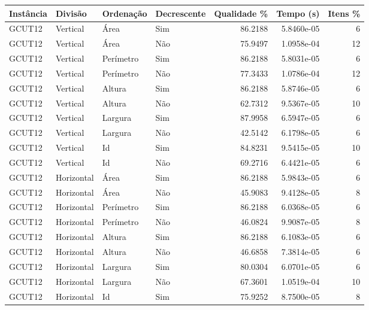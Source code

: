 \begin{tabular}{llllrrr}
\hline
Instância & Divisão     & Ordenação & Decrescente & Qualidade \% & Tempo (s)  & Itens \% \\
\hline
GCUT12    & Vertical    & Área      & Sim         & 86.2188      & 5.8460e-05 & 6        \\
GCUT12    & Vertical    & Área      & Não         & 75.9497      & 1.0958e-04 & 12       \\
GCUT12    & Vertical    & Perímetro & Sim         & 86.2188      & 5.8031e-05 & 6        \\
GCUT12    & Vertical    & Perímetro & Não         & 77.3433      & 1.0786e-04 & 12       \\
GCUT12    & Vertical    & Altura    & Sim         & 86.2188      & 5.8746e-05 & 6        \\
GCUT12    & Vertical    & Altura    & Não         & 62.7312      & 9.5367e-05 & 10       \\
GCUT12    & Vertical    & Largura   & Sim         & 87.9958      & 6.5947e-05 & 6        \\
GCUT12    & Vertical    & Largura   & Não         & 42.5142      & 6.1798e-05 & 6        \\
GCUT12    & Vertical    & Id        & Sim         & 84.8231      & 9.5415e-05 & 10       \\
GCUT12    & Vertical    & Id        & Não         & 69.2716      & 6.4421e-05 & 6        \\
GCUT12    & Horizontal  & Área      & Sim         & 86.2188      & 5.9843e-05 & 6        \\
GCUT12    & Horizontal  & Área      & Não         & 45.9083      & 9.4128e-05 & 8        \\
GCUT12    & Horizontal  & Perímetro & Sim         & 86.2188      & 6.0368e-05 & 6        \\
GCUT12    & Horizontal  & Perímetro & Não         & 46.0824      & 9.9087e-05 & 8        \\
GCUT12    & Horizontal  & Altura    & Sim         & 86.2188      & 6.1083e-05 & 6        \\
GCUT12    & Horizontal  & Altura    & Não         & 46.6858      & 7.3814e-05 & 6        \\
GCUT12    & Horizontal  & Largura   & Sim         & 80.0304      & 6.0701e-05 & 6        \\
GCUT12    & Horizontal  & Largura   & Não         & 67.3601      & 1.0519e-04 & 10       \\
GCUT12    & Horizontal  & Id        & Sim         & 75.9252      & 8.7500e-05 & 8        \\

\end{tabular}
